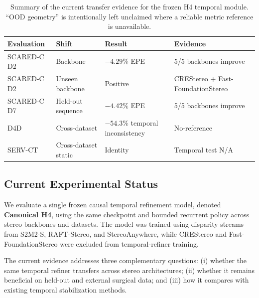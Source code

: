 \documentclass[11pt,a4paper]{article}
\begin{document}
\begin{table}[t]
    \centering
    \caption{
        Summary of the current transfer evidence for the frozen H4
        temporal module.
        ``OOD geometry'' is intentionally left unclaimed where a reliable
        metric reference is unavailable.
    }
    \label{tab:argos_transfer_summary}
    \small
    \begin{tabular}{llll}
        \toprule
        Evaluation & Shift & Result & Evidence \\
        \midrule
        SCARED-C D2
            & Backbone
            & $-4.29\%$ EPE
            & 5/5 backbones improve \\
        SCARED-C D2
            & Unseen backbone
            & Positive
            & CREStereo + Fast-FoundationStereo \\
        SCARED-C D7
            & Held-out sequence
            & $-4.42\%$ EPE
            & 5/5 backbones improve \\
        D4D
            & Cross-dataset
            & $-54.3\%$ temporal inconsistency
            & No-reference \\
        SERV-CT
            & Cross-dataset static
            & Identity
            & Temporal test N/A \\
        \bottomrule
    \end{tabular}
\end{table}


\subsection{Current Experimental Status}
\label{sec:current_status}

We evaluate a single frozen causal temporal refinement model, denoted
\textbf{Canonical H4}, using the same checkpoint and bounded recurrent
policy across stereo backbones and datasets.
The model was trained using disparity streams from S2M2-S,
RAFT-Stereo, and StereoAnywhere, while CREStereo and
Fast-FoundationStereo were excluded from temporal-refiner training.

The current evidence addresses three complementary questions:
(i) whether the same temporal refiner transfers across stereo
architectures;
(ii) whether it remains beneficial on held-out and external surgical
data; and
(iii) how it compares with existing temporal stabilization methods.


\end{document}
